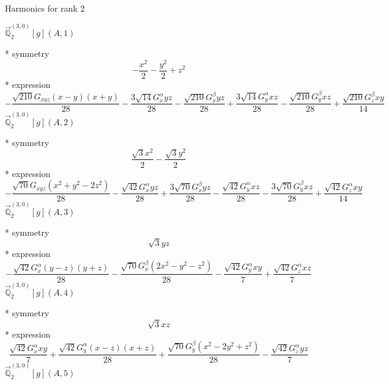 \documentclass[fleqn,8pt]{jsarticle}
\begin{document}
\noindent * Harmonics for rank 2

\noindent\quad $\vec{\mathbb{Q}}_{2}^{(3,0)}[g](A,1)$

\noindent\quad ** symmetry
\begin{dmath*}
- \frac{x^{2}}{2} - \frac{y^{2}}{2} + z^{2}
\end{dmath*}
\noindent\quad ** expression
\begin{dmath*}
- \frac{\sqrt{210} G_{xyz} \left(x - y\right) \left(x + y\right)}{28} - \frac{3 \sqrt{14} G_{x}^{\alpha} y z}{28} - \frac{\sqrt{210} G_{x}^{\beta} y z}{28} + \frac{3 \sqrt{14} G_{y}^{\alpha} x z}{28} - \frac{\sqrt{210} G_{y}^{\beta} x z}{28} + \frac{\sqrt{210} G_{z}^{\beta} x y}{14}
\end{dmath*}
\noindent\quad $\vec{\mathbb{Q}}_{2}^{(3,0)}[g](A,2)$

\noindent\quad ** symmetry
\begin{dmath*}
\frac{\sqrt{3} x^{2}}{2} - \frac{\sqrt{3} y^{2}}{2}
\end{dmath*}
\noindent\quad ** expression
\begin{dmath*}
- \frac{\sqrt{70} G_{xyz} \left(x^{2} + y^{2} - 2 z^{2}\right)}{28} - \frac{\sqrt{42} G_{x}^{\alpha} y z}{28} + \frac{3 \sqrt{70} G_{x}^{\beta} y z}{28} - \frac{\sqrt{42} G_{y}^{\alpha} x z}{28} - \frac{3 \sqrt{70} G_{y}^{\beta} x z}{28} + \frac{\sqrt{42} G_{z}^{\alpha} x y}{14}
\end{dmath*}
\noindent\quad $\vec{\mathbb{Q}}_{2}^{(3,0)}[g](A,3)$

\noindent\quad ** symmetry
\begin{dmath*}
\sqrt{3} y z
\end{dmath*}
\noindent\quad ** expression
\begin{dmath*}
- \frac{\sqrt{42} G_{x}^{\alpha} \left(y - z\right) \left(y + z\right)}{28} - \frac{\sqrt{70} G_{x}^{\beta} \left(2 x^{2} - y^{2} - z^{2}\right)}{28} - \frac{\sqrt{42} G_{y}^{\alpha} x y}{7} + \frac{\sqrt{42} G_{z}^{\alpha} x z}{7}
\end{dmath*}
\noindent\quad $\vec{\mathbb{Q}}_{2}^{(3,0)}[g](A,4)$

\noindent\quad ** symmetry
\begin{dmath*}
\sqrt{3} x z
\end{dmath*}
\noindent\quad ** expression
\begin{dmath*}
\frac{\sqrt{42} G_{x}^{\alpha} x y}{7} + \frac{\sqrt{42} G_{y}^{\alpha} \left(x - z\right) \left(x + z\right)}{28} + \frac{\sqrt{70} G_{y}^{\beta} \left(x^{2} - 2 y^{2} + z^{2}\right)}{28} - \frac{\sqrt{42} G_{z}^{\alpha} y z}{7}
\end{dmath*}
\noindent\quad $\vec{\mathbb{Q}}_{2}^{(3,0)}[g](A,5)$
\end{document}
